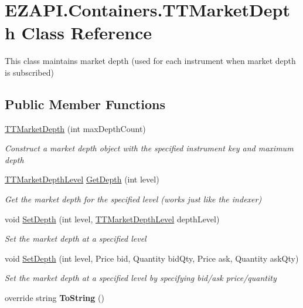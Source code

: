 \hypertarget{class_e_z_a_p_i_1_1_containers_1_1_t_t_market_depth}{\section{E\-Z\-A\-P\-I.\-Containers.\-T\-T\-Market\-Depth Class Reference}
\label{class_e_z_a_p_i_1_1_containers_1_1_t_t_market_depth}
}


This class maintains market depth (used for each instrument when market depth is subscribed)  


\subsection*{Public Member Functions}
\begin{DoxyCompactItemize}
\item 
\hyperlink{class_e_z_a_p_i_1_1_containers_1_1_t_t_market_depth_a7d266991d4b52fa8f5a8312af50c48f4}{T\-T\-Market\-Depth} (int max\-Depth\-Count)
\begin{DoxyCompactList}\small\item\em Construct a market depth object with the specified instrument key and maximum depth \end{DoxyCompactList}\item 
\hyperlink{class_e_z_a_p_i_1_1_containers_1_1_t_t_market_depth_level}{T\-T\-Market\-Depth\-Level} \hyperlink{class_e_z_a_p_i_1_1_containers_1_1_t_t_market_depth_a071cc62e46deeb1398b422fa31bb3e99}{Get\-Depth} (int level)
\begin{DoxyCompactList}\small\item\em Get the market depth for the specified level (works just like the indexer) \end{DoxyCompactList}\item 
void \hyperlink{class_e_z_a_p_i_1_1_containers_1_1_t_t_market_depth_aa22d9405be6647c77ce410340077cb5b}{Set\-Depth} (int level, \hyperlink{class_e_z_a_p_i_1_1_containers_1_1_t_t_market_depth_level}{T\-T\-Market\-Depth\-Level} depth\-Level)
\begin{DoxyCompactList}\small\item\em Set the market depth at a specified level \end{DoxyCompactList}\item 
void \hyperlink{class_e_z_a_p_i_1_1_containers_1_1_t_t_market_depth_a48f66f3bf4c938a28ffc98c10084f087}{Set\-Depth} (int level, Price bid, Quantity bid\-Qty, Price ask, Quantity ask\-Qty)
\begin{DoxyCompactList}\small\item\em Set the market depth at a specified level by specifying bid/ask price/quantity \end{DoxyCompactList}\item 
\hypertarget{class_e_z_a_p_i_1_1_containers_1_1_t_t_market_depth_aeb7d8f2c7be4c48e25776ad0cdb88747}{override string {\bfseries To\-String} ()}\label{class_e_z_a_p_i_1_1_containers_1_1_t_t_market_depth_aeb7d8f2c7be4c48e25776ad0cdb88747}

\end{DoxyCompactItemize}
